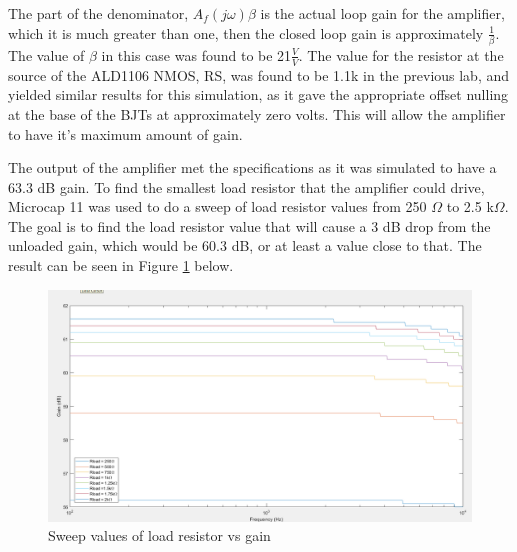 The part of the denominator, $A_f(j\omega)\beta$ is the actual loop gain for the amplifier, which it is much greater than one, then the closed loop gain is approximately $\frac{1}{\beta}$. The value of $\beta$ in this case was found to be 21$\frac{V}{V} $. The value for the resistor at the source of the ALD1106 NMOS, RS, was found to be 1.1k in the previous lab, and yielded similar results for this simulation, as it gave the appropriate offset nulling at the base of the BJTs at approximately zero volts. This will allow the amplifier to have it's maximum amount of gain. 

The output of the amplifier met the specifications as it was simulated to have a 63.3 dB gain. To find the smallest load resistor that the amplifier could drive, Microcap 11 was used to do a sweep of load resistor values from 250 $\Omega$ to 2.5 k$\Omega$. The goal is to find the load resistor value that will cause a 3 dB drop from the unloaded gain, which would be 60.3 dB, or at least a value close to that. The result can be seen in Figure \ref{fig:loadsweep} below.

\begin{figure}[H]
	\centering
	\includegraphics[width=0.7\linewidth]{CircuitDevelopment/varyrload.png}
	\caption{Sweep values of load resistor vs gain}
	\label{fig:loadsweep}
\end{figure}

